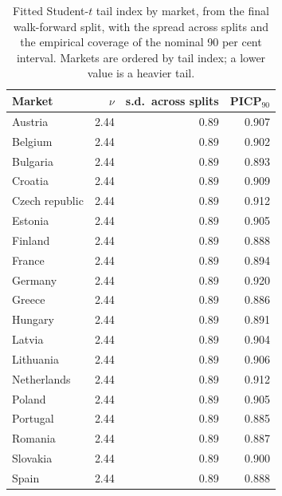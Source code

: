 \begin{table}[htbp]
\centering
\small
\caption{Fitted Student-$t$ tail index by market, from the final walk-forward split, with the spread across splits and the empirical coverage of the nominal 90 per cent interval. Markets are ordered by tail index; a lower value is a heavier tail.}
\label{tab:nu-by-channel}
\begin{tabular}{@{}lrrr@{}}
\toprule
Market & $\nu$ & s.d.\ across splits & PICP$_{90}$ \\
\midrule
Austria & 2.44 & 0.89 & 0.907 \\
Belgium & 2.44 & 0.89 & 0.902 \\
Bulgaria & 2.44 & 0.89 & 0.893 \\
Croatia & 2.44 & 0.89 & 0.909 \\
Czech republic & 2.44 & 0.89 & 0.912 \\
Estonia & 2.44 & 0.89 & 0.905 \\
Finland & 2.44 & 0.89 & 0.888 \\
France & 2.44 & 0.89 & 0.894 \\
Germany & 2.44 & 0.89 & 0.920 \\
Greece & 2.44 & 0.89 & 0.886 \\
Hungary & 2.44 & 0.89 & 0.891 \\
Latvia & 2.44 & 0.89 & 0.904 \\
Lithuania & 2.44 & 0.89 & 0.906 \\
Netherlands & 2.44 & 0.89 & 0.912 \\
Poland & 2.44 & 0.89 & 0.905 \\
Portugal & 2.44 & 0.89 & 0.885 \\
Romania & 2.44 & 0.89 & 0.887 \\
Slovakia & 2.44 & 0.89 & 0.900 \\
Spain & 2.44 & 0.89 & 0.888 \\
\bottomrule
\end{tabular}
\end{table}
